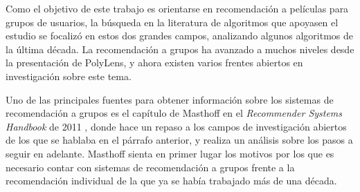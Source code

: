 Como el objetivo de este trabajo es orientarse en recomendación a películas para grupos de usuarios, la búsqueda en la literatura de algoritmos que apoyasen el estudio se focalizó en estos dos grandes campos, analizando algunos algoritmos de la última década. La recomendación a grupos ha avanzado a muchos niveles desde la presentación de PolyLens, y ahora existen varios frentes abiertos en investigación sobre este tema.

Uno de las principales fuentes para obtener información sobre los sistemas de recomendación a grupos es el capítulo de Masthoff en el \textit{Recommender Systems Handbook} de 2011 \cite{masthoff-handbook}, donde hace un repaso a los campos de investigación abiertos de los que se hablaba en el párrafo anterior, y realiza un análisis sobre los pasos a seguir en adelante. Masthoff sienta en primer lugar los motivos por los que es necesario contar con sistemas de recomendación a grupos frente a la recomendación individual de la que ya se había trabajado más de una década.